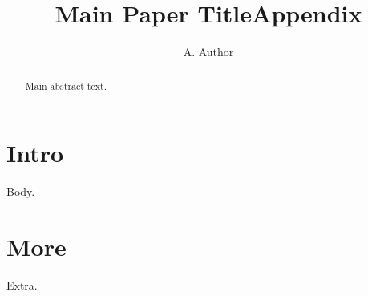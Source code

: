 \documentclass{article}
\title{Main Paper Title}\author{A. Author}
\makeatletter
\let\maketitle\relax\gdef\@title{}}}
\makeatother
\begin{document}
\maketitle
\begin{abstract}Main abstract text.\end{abstract}
\section{Intro} Body.
\title{Appendix}
\maketitle
\section{More} Extra.
\end{document}

